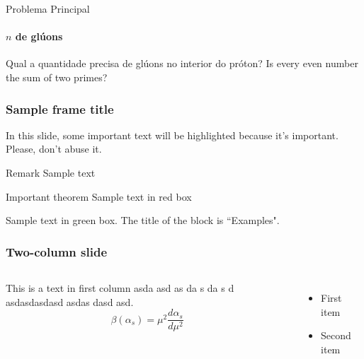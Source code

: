 \documentclass[aspectratio=169]{beamer}
\begin{document}
\newcommand{\autor}{Rodrigo Ribamar Silva do Nascimento}
\newcommand{\github}{github.com/physikices}
\newcommand{\email}{rodrigo.nascimento@edu.udesc.br}
\newcommand{\website}{}
\capa


\begin{frame}{Problema Principal}
	\framesubtitle{$n$ de glúons}
	\begin{block}{Qual a quantidade precisa de glúons no interior do próton?}
		Is every even number the sum of two primes?
		\cite{article2016}
	\end{block}
\end{frame}

\begin{frame}
	\frametitle{Sample frame title}

	In this slide, some important text will be
	\alert{highlighted} because it's important.
	Please, don't abuse it.

	\begin{block}{Remark}
		Sample text
	\end{block}

	\begin{alertblock}{Important theorem}
		Sample text in red box
	\end{alertblock}

	\begin{examples}
		Sample text in green box. The title of the block is ``Examples".
	\end{examples}
\end{frame}

\begin{frame}
	\frametitle{Two-column slide}
	\begin{columns}
		This is a text in first column asda asd as  da s da s d asdasdasdasd asdas dasd asd.
		$$\beta(\alpha_s)=\mu^{2}\frac{d\alpha_s}{d\mu^2}$$
		\begin{itemize}
			\item First item
			\item Second item
		\end{itemize}

	\end{columns}
\end{frame}
\end{document}
